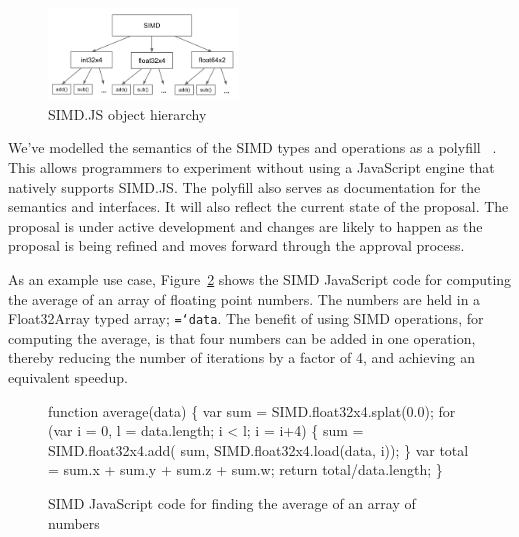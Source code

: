 \documentclass[preprint]{sigplanconf}
\newcommand{\ttt}[1]{{\texttt{\hyphenchar\font=`\-\relax #1}}}%
\begin{document}
\begin{figure}
\begin{center}
\includegraphics[width=0.45\textwidth]{figures/hierarchy.png}
\end{center}
\caption{SIMD.JS object hierarchy}
\label{fig:hierarchy}
\end{figure}

We've modelled the semantics of the SIMD types and operations as a polyfill 
~\cite{ecmascript-simd-polyfill}.  This allows programmers to experiment without
using a JavaScript engine that natively supports SIMD.JS.  The polyfill also 
serves as documentation for the semantics and interfaces.  It will also reflect 
the current state of the proposal.  The proposal is under active development 
and changes are likely to happen as the proposal is being refined and moves 
forward through the approval process.

As an example use case, Figure~\ref{fig:average-simd} shows the SIMD JavaScript
code for computing the average of an array of floating point numbers.  The numbers
are held in a Float32Array typed array; \ttt{data}.  The benefit of using SIMD 
operations, for computing the average, is that four numbers can be added in one
operation, thereby reducing the number of iterations by a factor of 4, and 
achieving an equivalent speedup.

\begin{figure}
\begin{small}
\begin{program}[style=tt, number=true]
fu\tab{}nction average(data) \{
  var sum = SIMD.float32x4.splat(0.0);
  fo\tab{}r (var i = 0, l = data.length; i < l; i = i+4) \{
    su\tab{}m = SIMD.float32x4.add(
      sum, SIMD.float32x4.load(data, i));\untab{}\untab{}
  \}
  var total = sum.x + sum.y + sum.z + sum.w;
  return total/data.length;\untab{}
\}
\end{program}
\end{small}
\caption{SIMD JavaScript code for finding the average of an array of numbers}
\label{fig:average-simd}
\end{figure}
\end{document}

